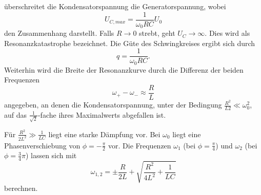 \noindent 
überschreitet die Kondensatorspannung die Generatorspannung, wobei 
\begin{equation}
    U_{C,max} = \frac{1}{\omega_0 RC} U_0 
\end{equation}
\noindent
den Zusammenhang darstellt. Falls $R \rightarrow 0$ strebt, geht $U_C \rightarrow \infty$. Dies 
wird als Resonanzkatastrophe bezeichnet. Die Güte des Schwingkreises ergibt sich durch
\begin{equation}
    q = \frac{1}{\omega_0 RC}.
    \label{eq:b1}
\end{equation}
\noindent
Weiterhin wird die Breite der Resonanzkurve durch die Differenz der beiden Frequenzen 
\begin{equation}
    \omega_+ - \omega_- \approx \frac{R}{L}
\end{equation}
angegeben, an denen die Kondensatorspannung, unter der Bedingung 
$\frac{R^{2}}{L{2}} \ll \omega_0^{2}$, auf das $\frac{1}{\sqrt{2}}$-fache
ihres Maximalwerts abgefallen ist.  

Für $\frac{R^{2}}{2L^{2}} \gg \frac{1}{LC}$ liegt eine starke Dämpfung vor. Bei $\omega_0$ liegt
eine Phasenverschiebung von $\phi = -\frac{\pi}{2}$ vor. Die Frequenzen $\omega_1$ (bei $\phi = \frac{\pi}{4}$) und
$\omega_2$ (bei $\phi = \frac{3}{4}\pi$) lassen sich mit 
\begin{equation}
    \omega_{1,2} = \pm \frac{R}{2L} + \sqrt{\frac{R^{2}}{4L^{2}}+\frac{1}{LC}}
    \label{eq:bb}
\end{equation}
\noindent berechnen.
